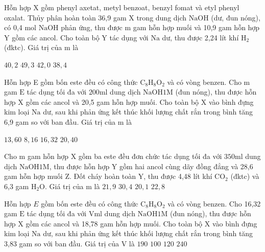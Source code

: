 \begin{ex}[3][][(Đề THPT QG - 2017)]
	 Hỗn hợp X gồm phenyl axetat, metyl benzoat, benzyl fomat và etyl phenyl oxalat. Thủy phân hoàn toàn 36,9 gam $\mathrm{X}$ trong dung dịch $\mathrm{NaOH}$ (dư, đun nóng), có 0,4 mol $\mathrm{NaOH}$ phản ứng, thu được $\mathrm{m}$ gam hỗn hợp muối và 10,9 gam hỗn hợp Y gồm các ancol. Cho toàn bộ $\mathrm{Y}$ tác dụng với $\mathrm{Na}$ dư, thu được 2,24 lít khí $\mathrm{H}_2$ (đktc). Giá trị của m là
	
	\choice
	{%
	\True	$ 40,2 $
	}
	{%
		$ 49,3 $
    }	
	{%
		$ 42,0 $
	}
	{%
	  $ 38,4 $
	}
	\sodongkeex[6]
\end{ex}
\begin{ex}[3][][(Đề THPT QG - 2018)]
	Hỗn hợp E gồm bốn este đều có công thức $\mathrm{C}_8 \mathrm{H}_8 \mathrm{O}_2$ và có vòng benzen. Cho $\mathrm{m}$ gam $\mathrm{E}$ tác dụng tối đa với $200 \mathrm{ml}$ dung dịch $\mathrm{NaOH} 1 \mathrm{M}$ (đun nóng), thu được hỗn hợp $\mathrm{X}$ gồm các ancol và 20,5 gam hỗn hợp muối. Cho toàn bộ $\mathrm{X}$ vào bình đựng kim loại $\mathrm{Na}$ dư, sau khi phản ứng kết thúc khối lượng chất rắn trong bình tăng 6,9 gam so với ban đầu. Giá trị của $\mathrm{m}$ là 
	
	\choice
	{%
	$ 13,60$
	}
	{%
	$ 8,16 $
	}	
	{%
	$ 16,32 $
	}
	{%
	\True $ 20,40 $
	}
	\sodongkeex[6]
\end{ex}
\begin{ex}[3][][(Đề THPT QG - 2018)]
	 Cho $\mathrm{m}$ gam hỗn hợp $\mathrm{X}$ gồm ba este đều đơn chức tác dụng tối đa với $350 \mathrm{ml}$ dung dịch $\mathrm{NaOH} 1 \mathrm{M}$, thu được hỗn hợp $\mathrm{Y}$ gồm hai ancol cùng dãy đồng đẳng và 28,6 gam hỗn hợp muối $\mathrm{Z}$. Đốt cháy hoàn toàn $\mathrm{Y}$, thu được 4,48 lít khí $\mathrm{CO}_2$ (đktc) và 6,3 gam $\mathrm{H}_2 \mathrm{O}$. Giá trị của m là
	\choice
	{%
	\True $ 21,9$
	}
	{%
		$ 30,4 $
	}	
	{%
		$ 20,1 $
	}
	{%
		$ 22,8 $
	}
	\sodongkeex[5]
\end{ex}
\begin{ex}[3][][(Đề THPT QG - 2018)]
	Hỗn hợp $E$ gồm bốn este đều có công thức $\mathrm{C}_8 \mathrm{H}_8 \mathrm{O}_2$ và có vòng benzen. Cho 16,32 gam $\mathrm{E}$ tác dụng tối đa với $\mathrm{V} \mathrm{ml}$ dung dịch $\mathrm{NaOH} 1 \mathrm{M}$ (đun nóng), thu được hỗn hợp $\mathrm{X}$ gồm các ancol và 18,78 gam hỗn hợp muối. Cho toàn bộ $\mathrm{X}$ vào bình đựng kim loại $\mathrm{Na}$ dư, sau khi phản ứng kết thúc khối lượng chất rắn trong bình tăng 3,83 gam so với ban đầu. Giá trị của $\mathrm{V}$ là
	\choice
	{%
	\True $190$
	}
	{%
		$100$
	}	
	{%
		$120$
	}
	{%
		$240$
	}
	\sodongkeex[8]
\end{ex}
